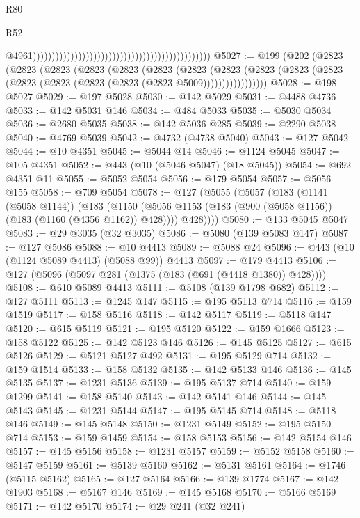 \begin{lexlean}{R80}
\begin{lexlean}{R52}
\begin{coremodule}
{{{{{{{{{{{{{{{{{{{{{{{{{{{{{{{{{{{{{{{{{{{{{{{{{{{{{{{{{{{{{{{{{{{{{{{{{{{{{{{{{{{{{{{{{{{{{{{{{{{{{{{{{{{{{{{{{{{{{{{{{{{{{{{{{{{{{{{{{{{{{{{{{{{{{{{{{{{{{{{{{{{{{{{{{{{{{{{{{{{{{{{{{{{{{{{{{{{{{{                                                                                                  @4961)))))))))))))))))))))))))))))))))))))))))))))))
@5027 := @199
    (@202
      (@2823
        (@2823
          (@2823
            (@2823
              (@2823
                (@2823
                  (@2823
                    (@2823
                      (@2823 (@2823 (@2823 (@2823 (@2823 (@2823 (@2823 (@2823 @5009)))))))))))))))))
@5028 := @198 @5027
@5029 := @197 @5028
@5030 := @142 @5029
@5031 := @4488 @4736
@5033 := @142 @5031 @146
@5034 := @484 @5033
@5035 := @5030 @5034
@5036 := @2680 @5035
@5038 := @142 @5036 @285
@5039 := @2290 @5038
@5040 := @4769 @5039
@5042 := @4732 (@4738 @5040)
@5043 := @127 @5042
@5044 := @10 @4351
@5045 := @5044 @14
@5046 := @1124 @5045
@5047 := @105 @4351
@5052 := @443 (@10 (@5046 @5047) (@18 @5045))
@5054 := @692 @4351 @11
@5055 := @5052 @5054
@5056 := @179 @5054
@5057 := @5056 @155
@5058 := @709 @5054
@5078 := @127
    (@5055
      (@5057
        (@183
          (@1141 (@5058 @1144))
          (@183
            (@1150 (@5056 @1153 (@183 (@900 (@5058 @1156)) (@183 (@1160 (@4356 @1162)) @428))))
            @428))))
@5080 := @133 @5045 @5047
@5083 := @29 @3035 (@32 @3035)
@5086 := @5080 (@139 @5083 @147)
@5087 := @127 @5086
@5088 := @10 @4413
@5089 := @5088 @24
@5096 := @443 (@10 (@1124 @5089 @4413) (@5088 @99)) @4413
@5097 := @179 @4413
@5106 := @127 (@5096 (@5097 @281 (@1375 (@183 (@691 (@4418 @1380)) @428))))
@5108 := @610 @5089 @4413
@5111 := @5108 (@139 @1798 @682)
@5112 := @127 @5111
@5113 := @1245 @147
@5115 := @195 @5113 @714
@5116 := @159 @1519
@5117 := @158 @5116
@5118 := @142 @5117
@5119 := @5118 @147
@5120 := @615 @5119
@5121 := @195 @5120
@5122 := @159 @1666
@5123 := @158 @5122
@5125 := @142 @5123 @146
@5126 := @145 @5125
@5127 := @615 @5126
@5129 := @5121 @5127 @492
@5131 := @195 @5129 @714
@5132 := @159 @1514
@5133 := @158 @5132
@5135 := @142 @5133 @146
@5136 := @145 @5135
@5137 := @1231 @5136
@5139 := @195 @5137 @714
@5140 := @159 @1299
@5141 := @158 @5140
@5143 := @142 @5141 @146
@5144 := @145 @5143
@5145 := @1231 @5144
@5147 := @195 @5145 @714
@5148 := @5118 @146
@5149 := @145 @5148
@5150 := @1231 @5149
@5152 := @195 @5150 @714
@5153 := @159 @1459
@5154 := @158 @5153
@5156 := @142 @5154 @146
@5157 := @145 @5156
@5158 := @1231 @5157
@5159 := @5152 @5158
@5160 := @5147 @5159
@5161 := @5139 @5160
@5162 := @5131 @5161
@5164 := @1746 (@5115 @5162)
@5165 := @127 @5164
@5166 := @139 @1774
@5167 := @142 @1903
@5168 := @5167 @146
@5169 := @145 @5168
@5170 := @5166 @5169
@5171 := @142 @5170
@5174 := @29 @241 (@32 @241)
}}}}}}}}}}}}}}}}}}}}}}}}}}}}}}}}}}}}}}}}}}}}}}}}}}}}}}}}}}}}}}}}}}}}}}}}}}}}}}}}}}}}}}}}}}}}}}}}}}}}}}}}}}}}}}}}}}}}}}}}}}}}}}}}}}}}}}}}}}}}}}}}}}}}}}}}}}}}}}}}}}}}}}}}}}}}}}}}}}}}}}}}}}}}}}}}}}}}}}
\end{coremodule}
\end{lexlean}
\end{lexlean}
